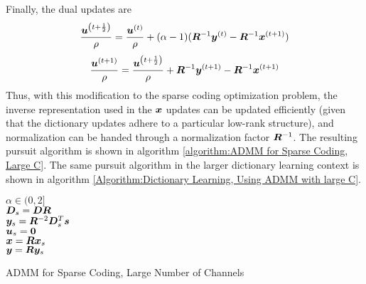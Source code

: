 %
Finally, the dual updates are 
\begin{equation}
\frac{\bm{u}^{\left(t + \frac{1}{2}\right)}}{\rho} = \frac{\bm{u}^{(t)}}{\rho} + (\alpha - 1)(\bm{R}^{-1}\bm{y}^{(t)} - \bm{R}^{-1}\bm{x}^{(t + 1)})
\end{equation}
%
\begin{equation}
\frac{\bm{u}^{(t + 1)}}{\rho} = \frac{\bm{u}^{\left(t + \frac{1}{2}\right)}}{\rho} + \bm{R}^{-1}\bm{y}^{(t + 1)} - \bm{R}^{-1}\bm{x}^{(t + 1)}
\end{equation}
%
Thus, with this modification to the sparse coding optimization problem, the inverse representation used in the $\bm{x}$ updates can be updated efficiently (given that the dictionary updates adhere to a particular low-rank structure), and normalization can be handed through a normalization factor $\bm{R}^{-1}$. The resulting pursuit algorithm is shown in algorithm \ref{algorithm:ADMM for Sparse Coding, Large C}. The same pursuit algorithm in the larger dictionary learning context is shown in algorithm \ref{Algorithm:Dictionary Learning, Using ADMM with large C}.


\begin{algorithm}[h]
\SetAlgoLined 
   $\alpha \in (0,2]$ \\
   $\bm{D}_s = \bm{D}\bm{R}$  \\
   $\bm{y}_s = \bm{R}^{-2}\bm{D}_s^T\bm{s}$ \\
   $\bm{u}_s = \bm{0}$ \\
  $\bm{x} = \bm{R}\bm{x}_s$ \\
  $\bm{y} = \bm{R}\bm{y}_s$
 \caption{ADMM for Sparse Coding, Large Number of Channels}\label{algorithm:ADMM for Sparse Coding, Large C}
\end{algorithm}

